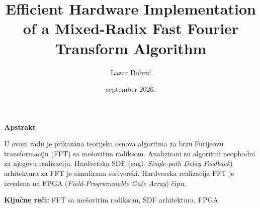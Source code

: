 \documentclass[a4paper,12pt, master]{etf}
\title{Efficient Hardware Implementation of a Mixed-Radix Fast Fourier Transform Algorithm}
\author{Lazar Dobrić}
\date{september 2026.}
\begin{document}

\maketitle

\begin{titlepage}
\null\vfil
\begin{center}
\bfseries Apstrakt
\end{center}
U ovom radu je prikazana teorijska osnova algoritma za brzu Furijeovu transformaciju (FFT) sa mešovitim radiksom. Analizirani su algoritmi neophodni za njegovu realizaciju. Hardverska SDF (engl. \emph{Single-path Delay Feedback}) arhitektura za FFT je simulirana softverski. Hardverska realizacija FFT je izvedena na FPGA (\emph{Field-Programmable Gate Array}) čipu.

\vspace{5ex}
\parindent 0pt {\bfseries Ključne reči:} FFT sa mešovitim radiksom, SDF arhitektura, FPGA
\par\vfil\null
\end{titlepage}
\end{document}

